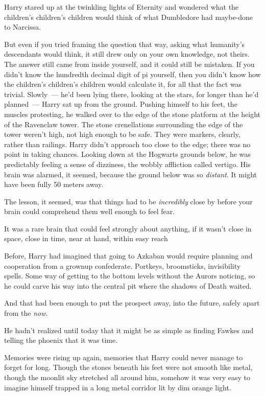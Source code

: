 Harry stared up at the twinkling lights of Eternity and wondered what the
children's children's children would think of what Dumbledore had maybe-done to
Narcissa.

But even if you tried framing the question that way, asking what humanity's
descendants would think, it still drew only on your own knowledge, not theirs.
The answer still came from inside yourself, and it could still be mistaken. If
you didn't know the hundredth decimal digit of pi yourself, then you didn't
know how the children's children's children would calculate it, for all that
the fact was trivial.
\sbreak
Slowly~--- he'd been lying there, looking at the stars, for longer than he'd
planned~--- Harry sat up from the ground. Pushing himself to his feet, the
muscles protesting, he walked over to the edge of the stone platform at the
height of the Ravenclaw tower. The stone crenellations surrounding the edge of
the tower weren't high, not high enough to be safe. They were markers, clearly,
rather than railings. Harry didn't approach too close to the edge; there was no
point in taking chances. Looking down at the Hogwarts grounds below, he was
predictably feeling a sense of dizziness, the wobbly affliction called vertigo.
His brain was alarmed, it seemed, because the ground below was so
\emph{distant}. It might have been fully 50 meters away.

The lesson, it seemed, was that things had to be \emph{incredibly} close by
before your brain could comprehend them well enough to feel fear.

It was a rare brain that could feel strongly about anything, if it wasn't close
in space, close in time, near at hand, within easy reach{\el}

Before, Harry had imagined that going to Azkaban would require planning and
cooperation from a grownup confederate. Portkeys, broomsticks, invisibility
spells. Some way of getting to the bottom levels without the Aurors noticing,
so he could carve his way into the central pit where the shadows of Death
waited.

And that had been enough to put the prospect away, into the future, safely
apart from the \emph{now}.

He hadn't realized until today that it might be as simple as finding Fawkes and
telling the phoenix that it was time.

Memories were rising up again, memories that Harry could never manage to forget
for long. Though the stones beneath his feet were not smooth like metal, though
the moonlit sky stretched all around him, somehow it was very easy to imagine
himself trapped in a long metal corridor lit by dim orange light.

